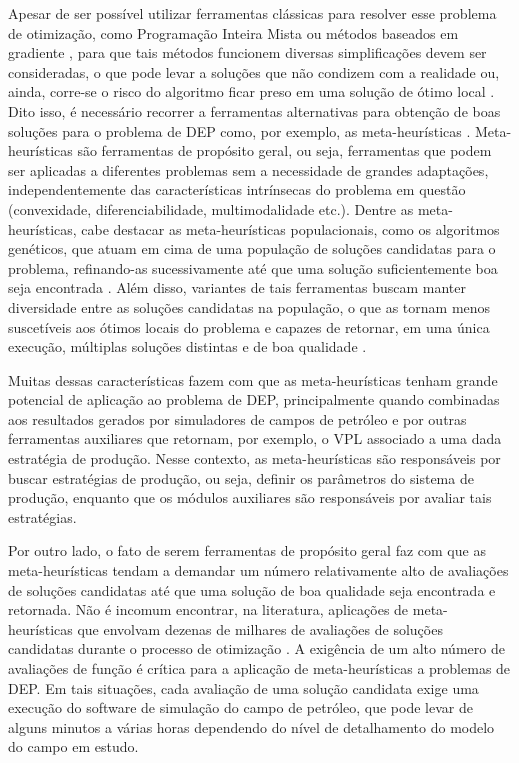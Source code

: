 Apesar de ser possível utilizar ferramentas clássicas para resolver esse problema de otimização, como Programação Inteira Mista \cite{Rosenwald1974} ou métodos baseados em gradiente \cite{Bangerth2006, Handels2007}, para que tais métodos funcionem diversas simplificações devem ser consideradas, o que pode levar a soluções que não condizem com a realidade ou, ainda, corre-se o risco do algoritmo ficar preso em uma solução de ótimo local \cite{Nasrabadi2012}. Dito isso, é necessário recorrer a ferramentas alternativas para obtenção de boas soluções para o problema de DEP como, por exemplo, as meta-heurísticas \cite{Blum2003}. Meta-heurísticas são ferramentas de propósito geral, ou seja, ferramentas que podem ser aplicadas a diferentes problemas sem a necessidade de grandes adaptações, independentemente das características intrínsecas do problema em questão (convexidade, diferenciabilidade, multimodalidade etc.). Dentre as meta-heurísticas, cabe destacar as meta-heurísticas populacionais, como os algoritmos genéticos, que atuam em cima de uma população de soluções candidatas para o problema, refinando-as sucessivamente até que uma solução suficientemente boa seja encontrada \cite{Back2000, decastro2006-CRC-fundamentals}. Além disso, variantes de tais ferramentas buscam manter diversidade entre as soluções candidatas na população, o que as tornam menos suscetíveis aos ótimos locais do problema e capazes de retornar, em uma única execução, múltiplas soluções distintas e de boa qualidade \cite{DeFranca2010}.

Muitas dessas características fazem com que as meta-heurísticas tenham grande potencial de aplicação ao problema de DEP, principalmente quando combinadas aos resultados gerados por simuladores de campos de petróleo e por outras ferramentas auxiliares que retornam, por exemplo, o VPL associado a uma dada estratégia de produção. Nesse contexto, as meta-heurísticas são responsáveis por buscar estratégias de produção, ou seja, definir os parâmetros do sistema de produção, enquanto que os módulos auxiliares são responsáveis por avaliar tais estratégias.

Por outro lado, o fato de serem ferramentas de propósito geral faz com que as meta-heurísticas tendam a demandar um número relativamente alto de avaliações de soluções candidatas até que uma solução de boa qualidade seja encontrada e retornada. Não é incomum encontrar, na literatura, aplicações de meta-heurísticas que envolvam dezenas de milhares de avaliações de soluções candidatas durante o processo de otimização \cite{Coelho2010}. A exigência de um alto número de avaliações de função é crítica para a aplicação de meta-heurísticas a problemas de DEP. Em tais situações, cada avaliação de uma solução candidata exige uma execução do software de simulação do campo de petróleo, que pode levar de alguns minutos a várias horas dependendo do nível de detalhamento do modelo do campo em estudo. 

